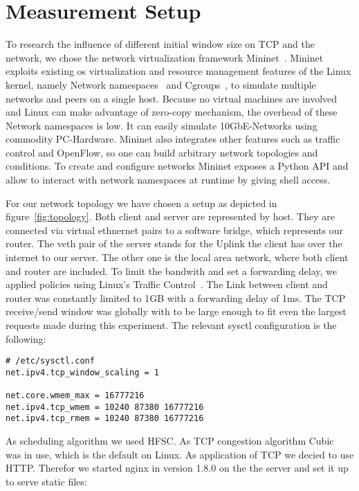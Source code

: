 \section{Measurement Setup}
\label{sec:measurement_setup}

To research the influence of different initial window size on TCP and the
network, we chose the network virtualization framework Mininet~\cite{mininet}.
Mininet exploits existing os virtualization and resource management features of
the Linux kernel, namely Network namespaces~\cite{network_namespaces} and
Cgroups~\cite{cgroups}, to simulate multiple networks and peers on a single
host. Because no virtual machines are involved and Linux can make advantage of
zero-copy mechanism, the overhead of these Network namespaces is low. It can
easily simulate 10GbE-Networks using commodity PC-Hardware. Mininet also
integrates other features such as traffic control and OpenFlow, so one can build
arbitrary network topologies and conditions. To create and configure networks
Mininet exposes a Python API and allow to interact with network namespaces at
runtime by giving shell access.



For our network topology we have chosen a setup as depicted in figure~\ref{fig:topology}.
Both client and server are represented by host. They are connected via virtual
ethnernet pairs to a software bridge, which represents our router. The veth pair
of the server stands for the Uplink the client has over the internet to our
server. The other one is the local area network, where both client and router
are included. To limit the bandwith and set a forwarding delay, we applied
policies using Linux's Traffic Control~\cite{tc}. The Link between client and
router was constantly limited to 1GB with a forwarding delay of 1ms. The TCP
receive/send window was globally with to be large enough to fit even the largest
requests made during this experiment. The relevant sysctl configuration is the
following:

\begin{lstlisting}
# /etc/sysctl.conf
net.ipv4.tcp_window_scaling = 1

net.core.wmem_max = 16777216
net.ipv4.tcp_wmem = 10240 87380 16777216
net.ipv4.tcp_rmem = 10240 87380 16777216
\end{lstlisting}

As scheduling algorithm we used HFSC. As TCP congestion algorithm
Cubic~\cite{cubic} was in use, which is the default on Linux. As application of
TCP we decied to use HTTP. Therefor we started nginx in version 1.8.0 on the the
server and set it up to serve static files:


